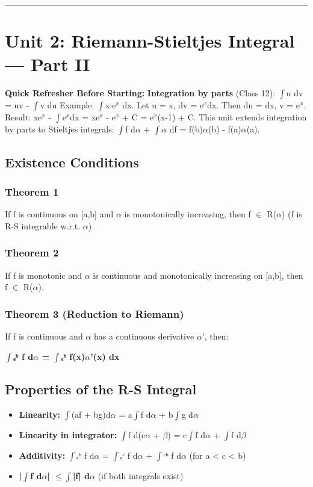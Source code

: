 \documentclass[12pt,a4paper,openany]{book}
\begin{document}
{{\bigskip\noindent\rule{\textwidth}{0.4pt}\bigskip

\section{Unit 2: Riemann-Stieltjes Integral — Part II}

\begin{prereqbox}
 \textbf{Quick Refresher Before Starting:}
\textbf{Integration by parts} (Class 12): $\int$u dv = uv - $\int$v du
Example: $\int$x$\cdot$e$^x$ dx. Let u = x, dv = e$^x$dx. Then du = dx, v = e$^x$.
Result: xe$^x$ - $\int$e$^x$dx = xe$^x$ - e$^x$ + C = e$^x$(x-1) + C.
This unit extends integration by parts to Stieltjes integrals: $\int$f d$\alpha$ + $\int\alpha$ df = f(b)$\alpha$(b) - f(a)$\alpha$(a).
\end{prereqbox}


\subsection{Existence Conditions}

\subsubsection{Theorem 1}
If f is continuous on [a,b] and $\alpha$ is monotonically increasing, then f $\in$ R($\alpha$) (f is R-S integrable w.r.t. $\alpha$).

\subsubsection{Theorem 2}
If f is monotonic and $\alpha$ is continuous and monotonically increasing on [a,b], then f $\in$ R($\alpha$).

\subsubsection{Theorem 3 (Reduction to Riemann)}
If f is continuous and $\alpha$ has a continuous derivative $\alpha$', then:

\textbf{$\int$ₐᵇ f d$\alpha$ = $\int$ₐᵇ f(x)$\alpha$'(x) dx}

\subsection{Properties of the R-S Integral}

\begin{itemize}
  \item \textbf{Linearity:} $\int$(af + bg)d$\alpha$ = a$\int$f d$\alpha$ + b$\int$g d$\alpha$
  \item \textbf{Linearity in integrator:} $\int$f d(c$\alpha$ + $\beta$) = c$\int$f d$\alpha$ + $\int$f d$\beta$
  \item \textbf{Additivity:} $\int$ₐᵇ f d$\alpha$ = $\int$ₐᶜ f d$\alpha$ + $\int$ᶜᵇ f d$\alpha$ (for a < c < b)
  \item \textbf{|$\int$f d$\alpha$| $\leq\int$|f| d$\alpha$} (if both integrals exist)
\end{itemize}

}}
\end{document}
